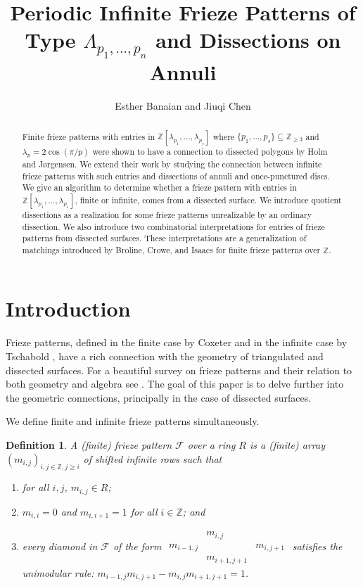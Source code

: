 \documentclass[12pt]{article}
\title{Periodic Infinite Frieze Patterns of Type $\Lambda_{p_1,\ldots,p_n}$ and Dissections on Annuli}
\author{Esther Banaian and Jiuqi Chen}
\date{}
\newtheorem{definition}{Definition}
\theoremstyle{remark}
\newcommand*{\fm}[2]{m_{#1,#2}}
\newcommand*{\F}{\mathcal{F}}
\newcommand*{\Z}{\mathbb{Z}}
\begin{document}
\maketitle
\begin{abstract}
    Finite frieze patterns with entries in $\mathbb{Z}[\lambda_{p_1},\ldots,\lambda_{p_s}]$ where $\{p_1,\ldots,p_s\} \subseteq \mathbb{Z}_{\geq 3}$ and $\lambda_p = 2 \cos(\pi/p)$ were shown to have a connection to dissected polygons by Holm and J{\o}rgensen. We extend their work by studying the connection between infinite frieze patterns with such entries and dissections of annuli and once-punctured discs. We give an algorithm to determine whether a frieze pattern with entries in $\mathbb{Z}[\lambda_{p_1},\ldots,\lambda_{p_s}]$, finite or infinite, comes from a dissected surface. We introduce quotient dissections as a realization for some frieze patterns unrealizable by an ordinary dissection. We also introduce two combinatorial interpretations for entries of frieze patterns from dissected surfaces. These interpretations are a generalization of matchings introduced by Broline, Crowe, and Isaacs for finite frieze patterns over $\mathbb{Z}$. 
\end{abstract}
\tableofcontents

\section{Introduction}

Frieze patterns, defined in the finite case by Coxeter \cite{10} and in the infinite case by Tschabold \cite{20}, have a rich connection with the geometry of triangulated and dissected surfaces. For a beautiful survey on frieze patterns and their relation to both geometry and algebra see \cite{16}. The goal of this paper is to delve further into the geometric connections, principally in the case of dissected surfaces.

We define finite and infinite frieze patterns simultaneously.

\begin{definition}
A (finite) frieze pattern $\F$ over a ring $R$ is a (finite) array $(m_{i,j})_{i,j\in \Z, j\geq i}$ of shifted infinite rows such that  
\begin{enumerate}
    \item for all $i,j$, $m_{i,j} \in R$;
    \item $\fm{i}{i} = 0$ and $\fm{i}{i+1} = 1$ for all $i\in \Z$; and
    \item every diamond in $\F$ of the form $\begin{array}{ccc} & \fm{i}{j} & \\ \fm{i-1}{j} & & \fm{i}{j+1} \\ & \fm{i+1}{j+1} & \end{array}$ satisfies the unimodular rule: $\fm{i-1}{j}\fm{i}{j+1}-\fm{i}{j}\fm{i+1}{j+1} = 1$.
\end{enumerate}
\end{definition}
\end{document}
